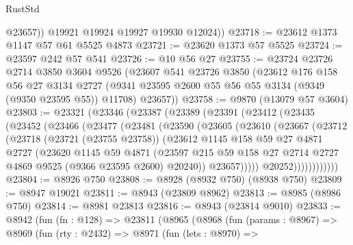 \begin{lexlean}{RustStd}
\begin{coremodule}
            @23657))
        @19921
        @19924
        @19927
        @19930
        @12024))
@23718 := @23612 @1373 @1147 @57 @61 @5525 @4873
@23721 := @23620 @1373 @57 @5525
@23724 := @23597 @242 @57 @541
@23726 := @10 @56 @27
@23755 := @23724
    @23726
    @2714
    @3850
    @3604
    @9526
    (@23607
      @541
      @23726
      @3850
      (@23612
        @176
        @158
        @56
        @27
        @3134
        @2727
        (@9341 @23595 @2600 @55 @56 @55 @3134 (@9349 (@9350 @23595 @55)) @11708)
        @23657))
@23758 := @9870 (@13079 @57 @3604)
@23803 := @23321
    (@23346
      (@23387
        (@23389
          (@23391
            (@23412
              (@23435
                (@23452
                  (@23466
                    (@23477
                      (@23481
                        (@23590
                          (@23605
                            (@23610
                              (@23667
                                (@23712
                                  (@23718
                                    (@23721 (@23755 @23758))
                                    (@23612
                                      @1145
                                      @158
                                      @59
                                      @27
                                      @4871
                                      @2727
                                      (@23620
                                        @1145
                                        @59
                                        @4871
                                        (@23597
                                          @215
                                          @59
                                          @158
                                          @27
                                          @2714
                                          @2727
                                          @4869
                                          @9525
                                          (@9366 @23595 @2600)
                                          @20240))
                                      @23657)))))
                            @20252))))))))))))
@23804 := @8926 @750
@23808 := @8928 (@8932 @750) (@8938 @750)
@23809 := @8947 @19021
@23811 := @8943 (@23809 @8962)
@23813 := @8985 (@8986 @750)
@23814 := @8981 @23813
@23816 := @8943 (@23814 @9010)
@23833 := @8942
    (fun (fn : @128) =>
    @23811
      (@8965
        (@8968
          (fun (params : @8967) =>
          @8969
            (fun (rty : @2432) =>
            @8971
              (fun (lets : @8970) =>

\end{coremodule}
\end{lexlean}
